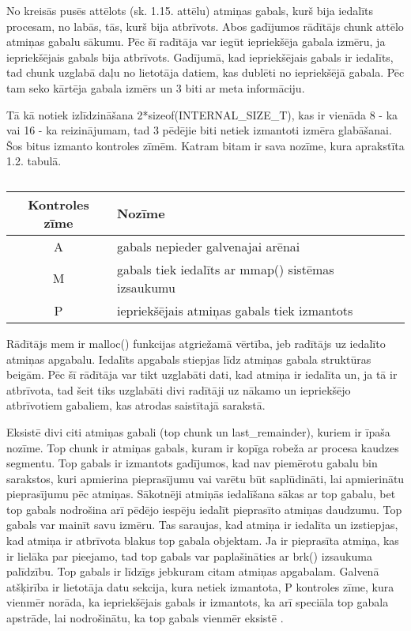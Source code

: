 No kreisās pusēs  attēlots (sk. 1.15. attēlu) \cite{CHOFM} atmiņas gabals, kurš bija iedalīts procesam, no labās, tās, kurš bija atbrīvots.
Abos gadījumos rādītājs chunk attēlo atmiņas gabalu sākumu. Pēc šī radītāja var iegūt iepriekšēja gabala izmēru, ja iepriekšējais gabals bija atbrīvots.
Gadījumā, kad iepriekšējais gabals ir iedalīts, tad chunk uzglabā daļu no lietotāja datiem, kas dublēti no iepriekšējā gabala. 
Pēc tam seko kārtēja gabala izmērs un 3 biti ar meta informāciju. 



Tā kā notiek izlīdzināšana 2*sizeof(INTERNAL\_SIZE\_T), kas ir vienāda 8 - ka vai 16 - ka  reizinājumam, tad 3 pēdējie biti netiek izmantoti izmēra glabāšanai. 
Šos bitus izmanto kontroles zīmēm. Katram bitam ir sava nozīme, kura aprakstīta 1.2. tabulā.

  \begin{table}[H]
\caption{\textbf{\fontsize{11}{12}\selectfont {\\ Atmiņas gabala kontroles zīmes}}} 
\label{table:kysymys}
\centering
	\begin{tabular}{|c|l|r|p{5cm}|}
	  \hline
	Kontroles zīme & Nozīme \\
	\hline
	  A & gabals nepieder galvenajai arēnai \\
      \hline
      M & gabals tiek iedalīts ar mmap() sistēmas izsaukumu \\
      \hline
      P & iepriekšējais atmiņas gabals tiek izmantots  \\
    \hline
	\end{tabular}
\end{table}

Rādītājs mem ir malloc() funkcijas atgriežamā vērtība, jeb radītājs uz iedalīto atmiņas apgabalu. Iedalīts apgabals stiepjas līdz atmiņas gabala struktūras beigām.
Pēc šī rādītāja var tikt uzglabāti dati, kad atmiņa ir iedalīta un, ja tā ir atbrīvota, tad šeit tiks uzglabāti divi radītāji uz nākamo un iepriekšējo atbrīvotiem gabaliem, kas atrodas saistītajā sarakstā. 


Eksistē divi citi atmiņas gabali (top chunk un last\_remainder), kuriem ir īpaša nozīme. 
Top chunk ir atmiņas gabals, kuram ir kopīga robeža ar procesa kaudzes segmentu.
Top gabals ir izmantots gadījumos, kad nav piemērotu gabalu bin sarakstos, kuri apmierina pieprasījumu vai varētu būt saplūdināti, lai apmierinātu pieprasījumu pēc atmiņas.
Sākotnēji atmiņās iedalīšana sākas ar top gabalu, bet top gabals nodrošina arī pēdējo iespēju iedalīt pieprasīto atmiņas daudzumu.
Top gabals var mainīt savu izmēru. Tas saraujas, kad atmiņa ir iedalīta un izstiepjas, kad atmiņa ir atbrīvota blakus top gabala objektam. 
Ja ir pieprasīta atmiņa, kas ir lielāka par pieejamo, tad top gabals var paplašināties ar brk() izsaukuma palīdzību.
Top gabals ir līdzīgs jebkuram citam atmiņas apgabalam. 
Galvenā atšķirība ir lietotāja datu sekcija, kura netiek izmantota, P kontroles zīme, kura vienmēr norāda, ka iepriekšējais gabals ir izmantots, ka arī speciāla top gabala apstrāde, lai nodrošinātu, ka top gabals vienmēr eksistē \cite {BLACKHAT}.

